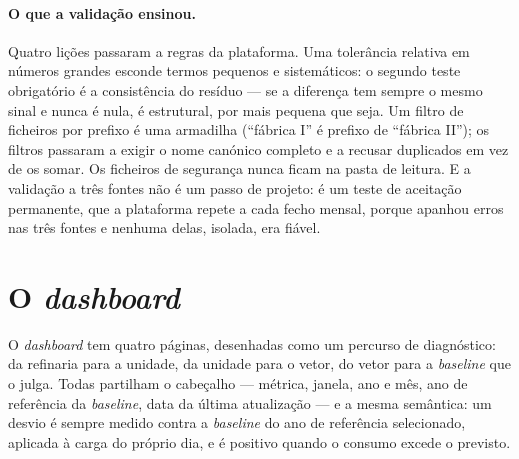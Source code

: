 \paragraph{O que a validação ensinou.} Quatro lições passaram a regras
da plataforma. Uma tolerância relativa em números grandes esconde termos
pequenos e sistemáticos: o segundo teste obrigatório é a consistência do
resíduo --- se a diferença tem sempre o mesmo sinal e nunca é nula, é
estrutural, por mais pequena que seja. Um filtro de ficheiros por prefixo
é uma armadilha (``fábrica I'' é prefixo de ``fábrica II''); os filtros
passaram a exigir o nome canónico completo e a recusar duplicados em vez
de os somar. Os ficheiros de segurança nunca ficam na pasta de leitura. E
a validação a três fontes não é um passo de projeto: é um teste de
aceitação permanente, que a plataforma repete a cada fecho mensal, porque
apanhou erros nas três fontes e nenhuma delas, isolada, era fiável.

\section{O \emph{dashboard}}
\label{sec:dashboard}

O \emph{dashboard} tem quatro páginas, desenhadas como um percurso de
diagnóstico: da refinaria para a unidade, da unidade para o vetor, do
vetor para a \emph{baseline} que o julga. Todas partilham o cabeçalho
--- métrica, janela, ano e mês, ano de referência da \emph{baseline}, data
da última atualização --- e a mesma semântica: um desvio é sempre medido
contra a \emph{baseline} do ano de referência selecionado, aplicada à carga
do próprio dia, e é positivo quando o consumo excede o previsto.

